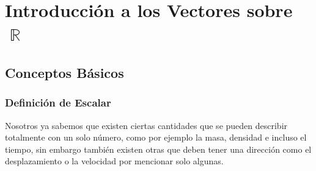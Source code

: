 \documentclass[12pt, fleqn]{report}                             %
\theoremstyle{break}                                            %
\DeclareMathOperator \Reals        {\mathbb{R}}                 %
\begin{document}
\restoregeometry                                                    %
\nopagecolor                                                        %






\tableofcontents{}
\label{sec:Index}

\clearpage



\part{Introducción a los Vectores sobre $\Reals$}



    \chapter{Conceptos Básicos}
    

        \clearpage
        \section{Definición de Escalar}

            Nosotros ya sabemos que existen ciertas cantidades que se pueden describir
            totalmente con un solo número, como por ejemplo la masa, densidad
            e incluso el tiempo, sin embargo también existen otras que deben tener una
            dirección como el desplazamiento o la velocidad por mencionar solo algunas.
\end{document}
